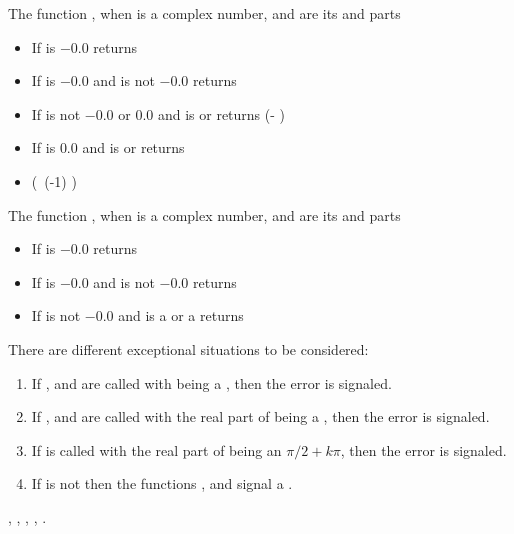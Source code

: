\documentclass[../Exponentials-Logarithms-Trigonometry.tex]{subfiles}
\begin{document}
\noindent
The function , when  is a complex number, 
and  are its  and  parts
\begin{itemize}
  \item If  is $-0.0$ returns 
  \item If  is $-0.0$ and  is not
$-0.0$ returns \code{)))}
  \item If  is not $-0.0$ or $0.0$ and
   is  or  returns
   \code{)} (- )\code{))}
  \item If  is $0.0$ and  is
   or  returns
  \item {}(\ (-1) )\code{)}
\end{itemize}

\noindent
The function , when  is a complex number, 
and  are its  and  parts
\begin{itemize}
  \item If  is $-0.0$ returns 
  \item If  is $-0.0$ and  is not
$-0.0$ returns \code{))))}
  \item If  is not $-0.0$ and  is a
   or a  returns \code{))}
\end{itemize}

\DExceptional{}

There are different exceptional situations to be considered:
\begin{enumerate}
  \item If ,  and  are called with
     being a , then the
     error is signaled.
  \item If ,  and  are called with the real
    part of  being a , then the
     error is signaled.
  \item If  is called with the real part of
     being an $\pi/2 + k\pi$, then the
     error is signaled.
  \item If  is not \CL{}
     then the functions ,  and
     signal a .
\end{enumerate}

\DSeeAlso{}

\code{*}, \code{-}, , , .
\end{document}
